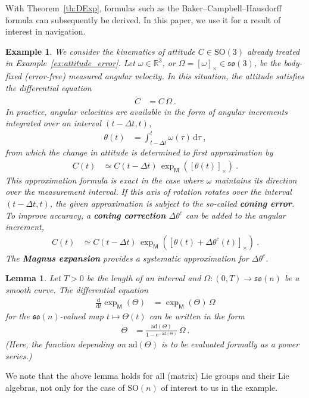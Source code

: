\documentclass[10pt,a4paper]{article}
\theoremstyle{mytheorem}
\newtheorem{lemma}[theorem]{Lemma}
\theoremstyle{mydefinition}
\newtheorem{example}[theorem]{Example}
\newcommand{\mydef}[1]{\textbf{\textit{#1}}}
\newcommand{\dt}{\mathrm{d}}
\newcommand{\ad}{\mathrm{ad}}
\newcommand{\SO}{\mathrm{SO}}
\newcommand{\fso}{\mathfrak{so}}
\begin{document}
With Theorem~\ref{th:DExp}, formulas such as the Baker--Campbell--Hausdorff formula can subsequently be derived.
In this paper, we use it for a result of interest in navigation.
\begin{example}
\label{ex:coning1}
We consider the kinematics of attitude $C\in\SO(3)$ already treated in Example~\ref{ex:attitude_error}.
Let $\omega\in\mathbb{R}^3$, or $\Omega=[\omega]_\times\in\fso(3)$, be the body-fixed (error-free) measured angular velocity.
In this situation, the attitude satisfies the differential equation
\begin{align*}
	\dot{C} &= C\,\Omega
	\ .
\end{align*}
In practice, angular velocities are available in the form of angular increments integrated over an interval $(t-\Delta t, t)$,
\begin{align*}
	\theta(t) &= \int_{t-\Delta t}^t\omega(\tau)\,\dt \tau
	\ ,
\end{align*}
from which the change in attitude is determined to first approximation by
\begin{align*}
	C(t) &\simeq C(t - \Delta t)\,\exp_\mathsf{M}([\theta(t)]_\times)
	\ .
\end{align*}
This approximation formula is exact in the case where $\omega$ maintains its direction over the measurement interval.
If this axis of rotation rotates over the interval $(t-\Delta t, t)$, the given approximation is subject to the so-called \mydef{coning error}.
To improve accuracy, a \mydef{coning correction} $\Delta\theta^c$ can be added to the angular increment,
\begin{align*}
	C(t) &\simeq C(t - \Delta t)\,
	\exp_\mathsf{M}([\theta(t) + \Delta\theta^c(t)]_\times)
	\ .
\end{align*}
The \mydef{Magnus expansion} provides a systematic approximation for $\Delta\theta^c$.\footnotemark
\end{example}

\begin{lemma}
\label{th:MagnusLemma}
Let $T>0$ be the length of an interval and $\Omega: (0,T)\rightarrow\fso(n)$ be a smooth curve.
The differential equation
\begin{align*}
	\frac{\dt}{\dt t}\exp_\mathsf{M}(\Theta)
	&= \exp_\mathsf{M}(\Theta)\,\Omega
\end{align*}
for the $\fso(n)$-valued map $t\mapsto\Theta(t)$ can be written in the form
\begin{align*}
	\dot{\Theta}
	&= \frac{\ad(\Theta)}{1 - \mathrm{e}^{-\ad(\Theta)}}\,\Omega
	\ .
\end{align*}
(Here, the function depending on $\ad(\Theta)$ is to be evaluated formally as a power series.)
\end{lemma}
We note that the above lemma holds for all (matrix) Lie groups and their Lie algebras, not only for the case of $\SO(n)$ of interest to us in the example.
\end{document}
